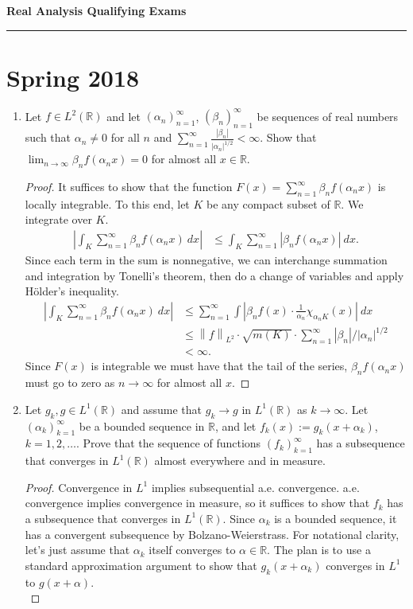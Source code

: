 \documentclass[11pt,letterpaper]{report}
\newcommand{\reals}{\mathbb{R}}
\newcommand{\Lp}[2]{\left\|{#1}\right\|_{L^{#2}}}
\begin{document}
\begin{center}
{\bf \Large Real Analysis Qualifying Exams} %
\vspace{0.2cm}
\hrule
\end{center}

\section{Spring 2018}
\begin{enumerate}
	\item Let $f\in L^2(\reals)$ and let $(\alpha_n)_{n=1}^\infty$, $(\beta_n)_{n=1}^\infty$ be sequences of real numbers such that $\alpha_n \neq 0$ for all $n$ and $\sum_{n=1}^\infty \frac{|\beta_n|}{|\alpha_n|^{1/2}}<\infty$. Show that $\lim_{n\to \infty}\beta_nf(\alpha_nx) = 0$ for almost all $x\in \reals$.
	\begin{proof}
		It suffices to show that the function $F(x) = \sum_{n=1}^\infty \beta_nf(\alpha_nx)$ is locally integrable. To this end, let $K$ be any compact subset of $\reals$. We integrate over $K$.
		\begin{align*}
			\left|\int_K\sum_{n=1}^\infty\beta_nf(\alpha_nx)\ dx\right| &\leq \int_K\sum_{n=1}^\infty|\beta_nf(\alpha_nx)|\ dx.
		\end{align*}
		Since each term in the sum is nonnegative, we can interchange summation and integration by Tonelli's theorem, then do a change of variables and apply H\"older's inequality.
		\begin{align*}
			\left|\int_K\sum_{n=1}^\infty\beta_nf(\alpha_nx)\ dx\right|&\leq \sum_{n=1}^\infty\int |\beta_nf(x)\cdot \frac{1}{\alpha_n}\chi_{\alpha_nK}(x)|\ dx\\
			&\leq \Lp{f}{2}\cdot \sqrt{m(K)}\cdot\sum_{n=1}^\infty|\beta_n|/|\alpha_n|^{1/2}\\
			&<\infty.
		\end{align*}
		Since $F(x)$ is integrable we must have that the tail of the series, $\beta_nf(\alpha_nx)$ must go to zero as $n\to \infty$ for almost all $x$.
	\end{proof}


	\item Let $g_k, g\in L^1(\reals)$ and assume that $g_k\to g$ in $L^1(\reals)$ as $k\to \infty$. Let $(\alpha_k)_{k=1}^\infty$ be a bounded sequence in $\reals$, and let $f_k(x):= g_k(x+\alpha_k)$, $k=1, 2, \ldots$. Prove that the sequence of functions $(f_k)_{k=1}^\infty$ has a subsequence that converges in $L^1(\reals)$ almost everywhere and in measure.
	\begin{proof}
		Convergence in $L^1$ implies subsequential a.e. convergence. a.e. convergence implies convergence in measure, so it suffices to show that $f_k$ has a subsequence that converges in $L^1(\reals)$. Since $\alpha_k$ is a bounded sequence, it has a convergent subsequence by Bolzano-Weierstrass. For notational clarity, let's just assume that $\alpha_k$ itself converges to $\alpha\in \reals$. The plan is to use a standard approximation argument to show that $g_k(x+\alpha_k)$ converges in $L^1$ to $g(x+\alpha)$.\\


\end{proof}
\end{enumerate}
\end{document}

